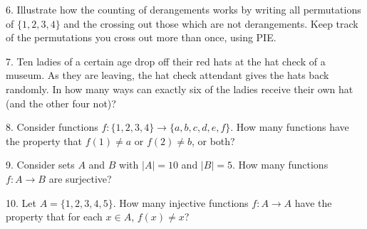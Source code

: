 \documentclass[10pt,]{book}
\theoremstyle{plain}
\theoremstyle{definition}
\theoremstyle{definition}
\theoremstyle{definition}
\numberwithin{equation}{chapter}
\begin{document}
\begin{exerciselist}
\par\smallskip
\item[6.]\hypertarget{exercise-97}{}
            Illustrate how the counting of derangements works by writing all permutations of \(\{1,2,3,4\}\) and the crossing out those which are not derangements. Keep track of the permutations you cross out more than once, using PIE.
\par\smallskip
\item[7.]\hypertarget{exercise-98}{}
            Ten ladies of a certain age drop off their red hats at the hat check of a museum. As they are leaving, the hat check attendant gives the hats back randomly. In how many ways can exactly six of the ladies receive their own hat (and the other four not)?
\par\smallskip
\item[8.]\hypertarget{exercise-99}{}
      Consider functions \(f: \{1,2,3,4\} \to \{a,b,c,d,e,f\}\).
      How many functions have the property that \(f(1) \ne a\) or \(f(2) \ne b\), or both?
\par\smallskip
\item[9.]\hypertarget{exercise-100}{}
      Consider sets \(A\) and \(B\) with \(|A| = 10\) and \(|B| = 5\). How many functions \(f: A \to B\) are surjective?
\par\smallskip
\item[10.]\hypertarget{exercise-101}{}
      Let \(A = \{1,2,3,4,5\}\). How many injective functions \(f:A \to A\) have the property that for each \(x \in A\), \(f(x) \ne x\)?
\par\smallskip
\end{exerciselist}
\typeout{************************************************}
\typeout{************************************************}
\end{document}
